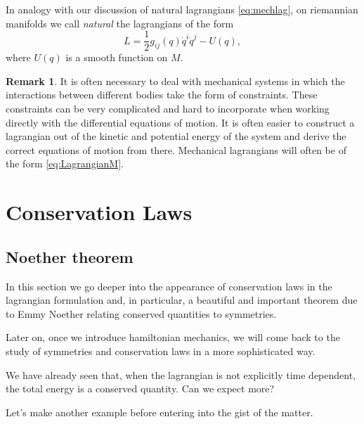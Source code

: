 \documentclass[english,fontsize=11pt,paper=b5]{scrbook}
\numberwithin{equation}{chapter}
\theoremstyle{definition}
\newtheorem{remark}{Remark}[chapter]
\begin{document}
    In analogy with our discussion of natural lagrangians \eqref{eq:mechlag}, on riemannian manifolds we call \emph{natural} the lagrangians of the form
    \begin{equation}\label{eq:LagrangianM}
      L = \frac 12 g_{ij}(q)\dot q^i \dot q^j - U(q),
    \end{equation}
    where $U(q)$ is a smooth function on $M$.

    \begin{remark}
      It  is  often  necessary  to  deal  with  mechanical  systems  in  which the interactions between different bodies take the form of constraints.
      These constraints can  be  very  complicated  and  hard  to  incorporate  when  working directly  with  the differential  equations  of  motion.
      It  is  often  easier  to  construct  a  lagrangian out of the kinetic and potential energy of the system and derive the correct equations of motion from there.
      Mechanical lagrangians will often be of the form \eqref{eq:LagrangianM}.
    \end{remark}


    \chapter{Conservation Laws}

    \section{Noether theorem}

    In this section we go deeper into the appearance of conservation laws in the lagrangian formulation and, in particular, a beautiful and important theorem due to Emmy Noether relating conserved quantities to symmetries.

    Later on, once we introduce hamiltonian mechanics, we will come back to the study of symmetries and conservation laws in a more sophisticated way.

    We have already seen that, when the lagrangian is not explicitly time dependent, the total energy is a conserved quantity.
    Can we expect more?

    Let's make another example before entering into the gist of the matter.
\end{document}
